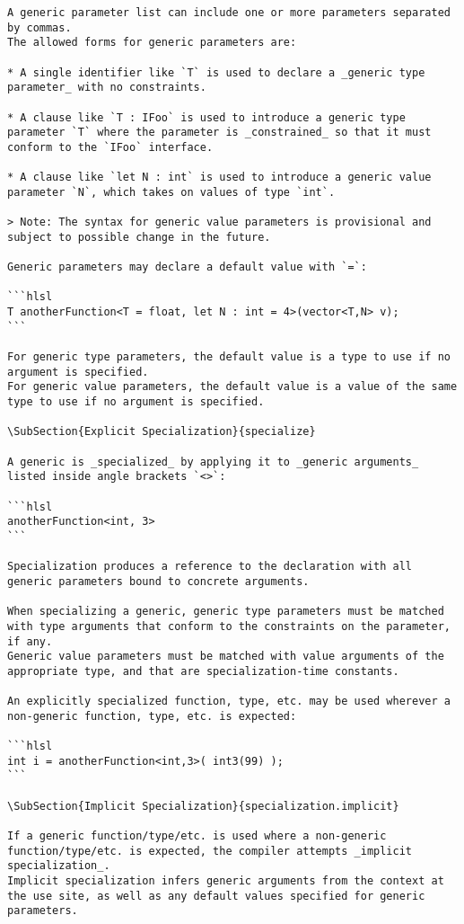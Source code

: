 \begin{verbatim}
A generic parameter list can include one or more parameters separated by commas.
The allowed forms for generic parameters are:

* A single identifier like `T` is used to declare a _generic type parameter_ with no constraints.

* A clause like `T : IFoo` is used to introduce a generic type parameter `T` where the parameter is _constrained_ so that it must conform to the `IFoo` interface.

* A clause like `let N : int` is used to introduce a generic value parameter `N`, which takes on values of type `int`.

> Note: The syntax for generic value parameters is provisional and subject to possible change in the future.

Generic parameters may declare a default value with `=`:

```hlsl
T anotherFunction<T = float, let N : int = 4>(vector<T,N> v);
```

For generic type parameters, the default value is a type to use if no argument is specified.
For generic value parameters, the default value is a value of the same type to use if no argument is specified.

\SubSection{Explicit Specialization}{specialize}

A generic is _specialized_ by applying it to _generic arguments_ listed inside angle brackets `<>`:

```hlsl
anotherFunction<int, 3>
```

Specialization produces a reference to the declaration with all generic parameters bound to concrete arguments.

When specializing a generic, generic type parameters must be matched with type arguments that conform to the constraints on the parameter, if any.
Generic value parameters must be matched with value arguments of the appropriate type, and that are specialization-time constants.

An explicitly specialized function, type, etc. may be used wherever a non-generic function, type, etc. is expected:

```hlsl
int i = anotherFunction<int,3>( int3(99) );
```

\SubSection{Implicit Specialization}{specialization.implicit}

If a generic function/type/etc. is used where a non-generic function/type/etc. is expected, the compiler attempts _implicit specialization_.
Implicit specialization infers generic arguments from the context at the use site, as well as any default values specified for generic parameters.


\end{verbatim}
